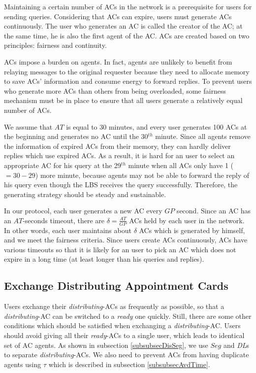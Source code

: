 \noindent Maintaining a certain number of ACs in the network is a prerequisite for users for sending queries. Considering that ACs can expire, users must generate ACs continuously. The user who generates an AC is called the creator of the AC; at the same time, he is also the first agent of the AC. ACs are created based on two principles: fairness and continuity. 

ACs impose a burden on agents. In fact, agents are unlikely to benefit from relaying messages to the original requester because they need to allocate memory to save ACs' information and consume energy to forward replies. To prevent users who generate more ACs than others from being overloaded, some fairness mechanism must be in place to ensure that all users generate a relatively equal number of ACs.

We assume that $AT$ is equal to 30 minutes, and every user generates 100 ACs at the beginning and generates no AC until the 30${}^{th}$ minute. Since all agents remove the information of expired ACs from their memory, they can hardly deliver replies which use expired ACs. As a result, it is hard for an user to select an appropriate AC for his query at the 29${}^{th}$ minute when all ACs only have 1 ($=30-29$) more minute, because agents may not be able to forward the reply of his query even though the LBS receives the query successfully. Therefore, the generating strategy should be steady and sustainable.

In our protocol, each user generates a new AC every $GP$ second. Since an AC has an $AT$-seconds timeout, there are $\delta =\frac{AT}{GP}$ ACs held by each user in the network. In other words, each user maintains about $\delta$ ACs which is generated by himself, and we meet the fairness criteria. Since users create ACs continuously, ACs have various timeouts so that it is likely for an user to pick an AC which does not expire in a long time (at least longer than his queries and replies).


\subsection{Exchange Distributing Appointment Cards}\label{subsec_ExchangeDisAptCrd}

\noindent Users exchange their \textit{distributing}-ACs as frequently as possible, so that a \textit{distributing}-AC can be switched to a \textit{ready} one quickly. Still, there are some other conditions which should be satisfied when exchanging a \textit{distributing}-AC. Users should avoid giving all their \textit{ready}-ACs to a single user, which leads to identical set of AC agents. As shown in subsection \ref{subsubsecDisSeg}, we use $Seg$ and \textit{DL}s to separate \textit{distributing}-ACs. We also need to prevent ACs from having duplicate agents using $\tau$ which is described in subsection \ref{subsubsecAvdTime}.

